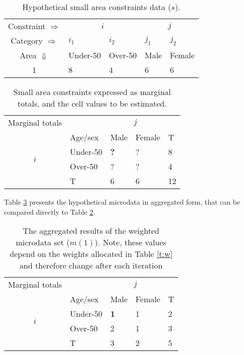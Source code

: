 \documentclass[a4paper,10pt]{article}
\begin{document}
\begin{table}[htbp]
\centering
\caption{Hypothetical small area constraints data ($s$).}
\begin{tabular}{cllll}
\toprule
Constraint $\Rightarrow$ & \multicolumn{2}{c}{$i$}& \multicolumn{2}{c}{$j$}\\
Category $\Rightarrow$ & $i_1$ & $i_2$ & $j_1$ & $j_2$ \\
Area $\Downarrow$  & Under-50 & Over-50 &  Male & Female\\
1  & 8 & 4 & 6 & 6\\
\bottomrule
\end{tabular}
\label{t:s}
\end{table}
\vspace{1cm}

\begin{table}[htbp]
\centering
\caption{Small area constraints expressed as marginal totals, and the cell
values to be estimated.}
\begin{tabular}{cllll}\toprule
Marginal totals&  & \multicolumn{2}{c}{$j$} & \\
& Age/sex & Male & Female & T\\ \midrule
\multirow{2}{*}{$i$} & Under-50 & \textbf{?} & ? & 8\\
& Over-50 & ? & ? &4 \\
& T & 6 & 6 &12\\
\bottomrule
\end{tabular}
\label{t:s2}
\end{table}

Table \ref{t:m} presents the
hypothetical microdata in aggregated form,
that can be compared directly to Table \ref{t:s2}.

\begin{table}[htbp]
\centering
\caption{The aggregated results of the weighted
microdata set ($m(1)$).
Note, these values depend on the
weights allocated in Table \ref{t:w} and therefore
 change after each iteration}

\begin{tabular}{cllll}\toprule
Marginal totals&  & \multicolumn{2}{c}{$j$} & \\
& Age/sex & Male & Female & T\\ \midrule
\multirow{2}{*}{$i$} & Under-50 & \textbf{1} & 1 & 2\\
& Over-50 & 2 & 1 &3 \\
& T & 3 & 2 &5\\
\bottomrule
\end{tabular}
\label{t:m}
\end{table}
\end{document}
